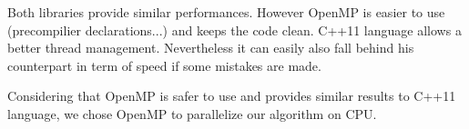Both libraries provide similar performances\cite{OpenMP_vs_CC}. However OpenMP is easier to use (precompilier declarations...) and keeps the code clean\cite{OpenMp_vs_explicit_threading}. C++11 language allows a better thread management. Nevertheless it can easily also fall behind his counterpart in term of speed if some mistakes are made.

Considering that OpenMP is safer to use and provides similar results to C++11 language, we chose OpenMP to parallelize our algorithm on CPU.